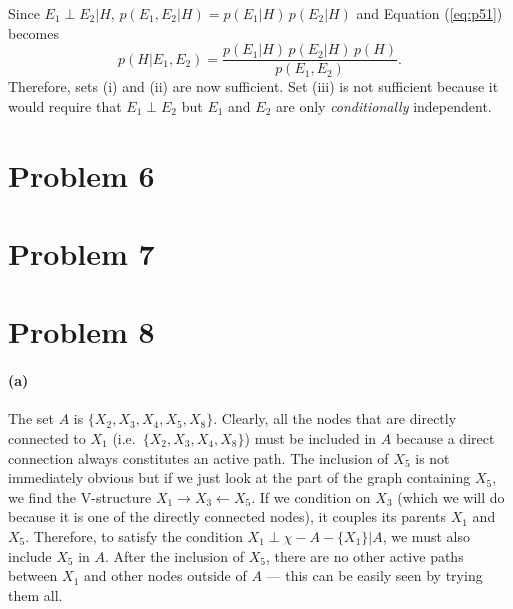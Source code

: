 \documentclass[11pt]{article}
\newcommand{\eq}[1]{Equation (\ref{eq:#1})}
\newcommand{\pr}[1]{\ensuremath{p(#1)}}
\begin{document}
Since $E_1 \perp E_2 | H$, $\pr{E_1, E_2|H} = \pr{E_1|H}\,\pr{E_2|H}$ and
\eq{p51} becomes
\begin{equation}
    \pr{H | E_1,E_2} = \frac{\pr{E_1|H}\, \pr{E_2|H} \, \pr{H}}{\pr{E_1,E_2}}.
\end{equation}
Therefore, sets (i) and (ii) are now sufficient. Set (iii) is not sufficient
because it would require that $E_1 \perp E_2$ but $E_1$ and $E_2$ are only
\emph{conditionally} independent.

\section{Problem 6}

\section{Problem 7}

\section{Problem 8}

\paragraph{(a)}

The set $A$ is $\{ X_2, X_3, X_4, X_5, X_8 \}$. Clearly, all the nodes
that are directly connected to $X_1$ (i.e.~$\{ X_2, X_3, X_4, X_8 \}$) must
be included in $A$ because a direct connection always constitutes an active
path. The inclusion of $X_5$ is not immediately obvious but if we just look
at the part of the graph containing $X_5$, we find the V-structure
$X_1 \to X_3 \gets X_5$. If we condition on $X_3$ (which we will do because
it is one of the directly connected nodes), it couples its parents $X_1$
and $X_5$.  Therefore, to satisfy the condition $X_1 \perp \chi-A-\{X_1\}|A$,
we must also include $X_5$ in $A$.  After the inclusion of $X_5$, there are
no other active paths between $X_1$ and other nodes outside of $A$ --- this
can be easily seen by trying them all.
\end{document}

